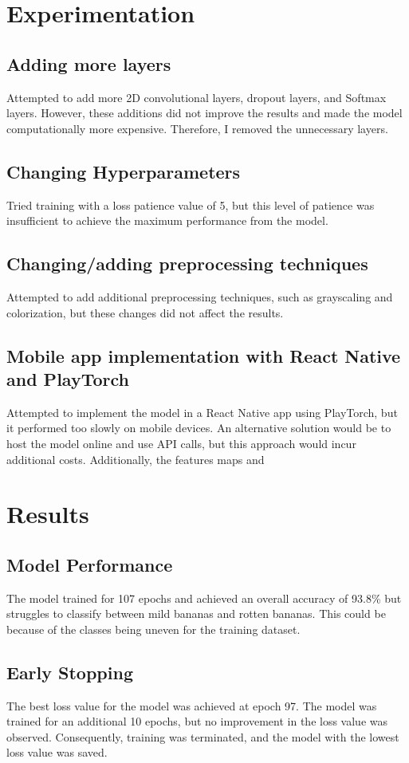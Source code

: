 \documentclass[a4paper,oneside,11pt]{book}
\begin{document}
\chapter{Experimentation}
\section{Adding more layers}
Attempted to add more 2D convolutional layers, dropout layers, and Softmax layers. However, these additions did not improve the results and made the model computationally more expensive. Therefore, I removed the unnecessary layers.
\section{Changing Hyperparameters}
Tried training with a loss patience value of 5, but this level of patience was insufficient to achieve the maximum performance from the model.
\section{Changing/adding preprocessing techniques}
Attempted to add additional preprocessing techniques, such as grayscaling and colorization, but these changes did not affect the results.
\section{Mobile app implementation with React Native and PlayTorch}
Attempted to implement the model in a React Native app using PlayTorch, but it performed too slowly on mobile devices. An alternative solution would be to host the model online and use API calls, but this approach would incur additional costs. Additionally, the features maps and 
\chapter{Results}
\section{Model Performance}
The model trained for 107 epochs and achieved an overall accuracy of 93.8\% but struggles to classify between mild bananas and rotten bananas. This could be because of the classes being uneven for the training dataset.
\section{Early Stopping}
The best loss value for the model was achieved at epoch 97. The model was trained for an additional 10 epochs, but no improvement in the loss value was observed. Consequently, training was terminated, and the model with the lowest loss value was saved.
\end{document}

